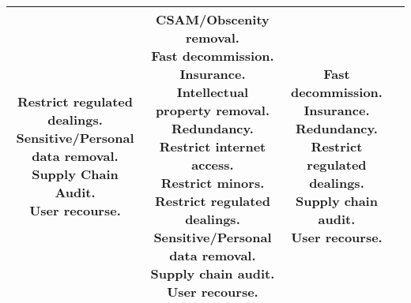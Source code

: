 \documentclass[fleqn]{article}
\begin{document}
\begin{landscape}
\begin{table}[H]
\begin{tabular}{|c|c|c|c|}
{			\textbullet\hspace{3pt} Restrict regulated dealings. \\ 	
			\textbullet\hspace{3pt} Sensitive/Personal data removal. \\ 	
			\textbullet\hspace{3pt} Supply Chain Audit. \\ 	
			\textbullet\hspace{3pt} User recourse. \\ 		 	 	 
		}
		& \makecell[l]{
			\textbullet\hspace{3pt} CSAM/Obscenity removal. \\ 	
			\textbullet\hspace{3pt} Fast decommission. \\ 	
			\textbullet\hspace{3pt} Insurance. \\ 	
			\textbullet\hspace{3pt} Intellectual property removal. \\ 	
			\textbullet\hspace{3pt} Redundancy. \\ 	
			\textbullet\hspace{3pt} Restrict internet access. \\ 	
			\textbullet\hspace{3pt} Restrict minors. \\ 	
			\textbullet\hspace{3pt} Restrict regulated dealings. \\ 	
			\textbullet\hspace{3pt} Sensitive/Personal data removal. \\ 	
			\textbullet\hspace{3pt} Supply chain audit. \\ 	
			\textbullet\hspace{3pt} User recourse. \\					 	 
		}
		& \makecell[l]{
			\textbullet\hspace{3pt} Fast decommission. \\ 	
			\textbullet\hspace{3pt} Insurance. \\ 	
			\textbullet\hspace{3pt} Redundancy. \\ 	
			\textbullet\hspace{3pt} Restrict regulated dealings. \\ 	
			\textbullet\hspace{3pt} Supply chain audit. \\ 	
			\textbullet\hspace{3pt} User recourse. \\  					 	 
		}
		\\
		\hline
	\end{tabular}
	\label{table:high_risk_plan_by_tc_cont}
\end{table}

\vfill
\raisebox{-10pt}{\makebox[\linewidth]{\thepage}}
\end{landscape}
\end{document}
